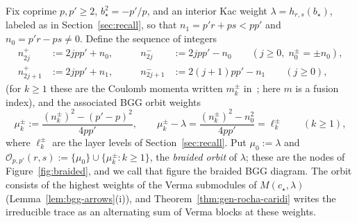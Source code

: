 \documentclass[twoside,10pt]{article}
\numberwithin{equation}{section}
\theoremstyle{slbody}
\theoremstyle{definition}
\theoremstyle{remark}
\begin{document}
Fix coprime \(p,p'\geq2\), \(b_\star^2=-p'/p\), and an interior Kac weight
\(\lambda=h_{r,s}(b_\star)\), labeled as in Section~\ref{sec:recall}, so that
\(n_1=p'r+ps<pp'\) and \(n_0=p'r-ps\neq0\).  Define the sequence of
integers
\begin{equation}\label{eq:bgg-momenta}
 \begin{aligned}
  n^+_{2j}&:=2jpp'+n_0, &\qquad n^-_{2j}&:=2jpp'-n_0 \qquad (j\geq0,\;n^\pm_0=\pm n_0),\\
  n^+_{2j+1}&:=2jpp'+n_1, &\qquad n^-_{2j+1}&:=2(j+1)pp'-n_1 \qquad (j\geq0),
 \end{aligned}
\end{equation}
(for \(k\geq1\) these are the Coulomb momenta written \(m^\pm_k\)
in~\cite[Section~8]{PolzerColliding2026}; here \(m\) is a fusion index), and
the associated BGG orbit weights
\begin{equation}\label{eq:bgg-weights}
 \mu^\pm_k:=\frac{(n^\pm_k)^2-(p'-p)^2}{4pp'}, \qquad
 \mu^\pm_k-\lambda=\frac{(n^\pm_k)^2-n_0^2}{4pp'}=\ell^\pm_k \qquad (k\geq1),
\end{equation}
where \(\ell^\pm_k\) are the layer levels of Section~\ref{sec:recall}.  Put
\(\mu_0:=\lambda\) and \(\mathcal{O}_{p,p'}(r,s):=\{\mu_0\}\cup
\{\mu^\pm_k:k\geq1\}\), the \emph{braided orbit} of \(\lambda\); these are the
nodes of Figure~\ref{fig:braided}, and we call that figure the braided BGG
diagram.  The orbit consists of the highest weights of the Verma submodules of
\(M(c_\star,\lambda)\) (Lemma~\ref{lem:bgg-arrows}(i)), and
Theorem~\ref{thm:gen-rocha-caridi} writes the irreducible trace as an
alternating sum of Verma blocks at these weights.
\end{document}
